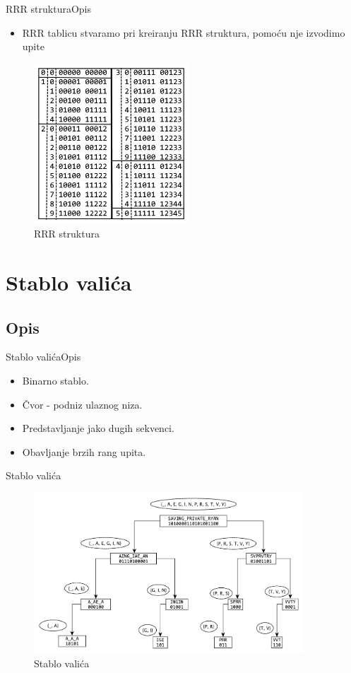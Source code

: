 \documentclass{beamer}
\begin{document}
\begin{frame}{RRR struktura}{Opis}
  \begin{itemize}
  \item {
    RRR tablicu stvaramo pri kreiranju RRR struktura, pomoću nje izvodimo upite
  }
  \end{itemize}
    \begin{figure}[H]
    \centering
    \includegraphics[height=6cm]{img/rrrtable.png}
    \caption{RRR struktura}
    \end{figure}
\end{frame}

\section{Stablo valića}
\subsection{Opis}
\begin{frame}{Stablo valića}{Opis}
\begin{itemize}
  \item {
    Binarno stablo.
  }
  \item {
    Čvor - podniz ulaznog niza.
  }
    \item {
    Predstavljanje jako dugih sekvenci.
  }
    \item {
    Obavljanje brzih rang upita.
  }
  \end{itemize}
\end{frame}

\begin{frame}{Stablo valića}
    \begin{figure}[H]
    \centering
    \includegraphics[width=0.9\textwidth]{img/wavelet_tree.pdf}
    \caption{Stablo valića}
    \end{figure}
\end{frame}
\end{document}
